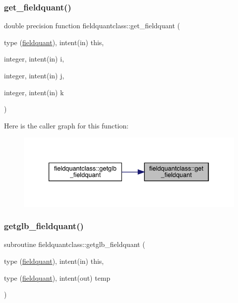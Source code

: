 \subsubsection{\texorpdfstring{get\_fieldquant()}{get\_fieldquant()}}
{\footnotesize\ttfamily double precision function fieldquantclass\+::get\+\_\+fieldquant (\begin{DoxyParamCaption}\item[{type (\mbox{\hyperlink{namespacefieldquantclass_structfieldquantclass_1_1fieldquant}{fieldquant}}), intent(in)}]{this,  }\item[{integer, intent(in)}]{i,  }\item[{integer, intent(in)}]{j,  }\item[{integer, intent(in)}]{k }\end{DoxyParamCaption})}

Here is the caller graph for this function\+:\nopagebreak
\begin{figure}[H]
\begin{center}
\leavevmode
\includegraphics[width=333pt]{namespacefieldquantclass_a5d4c07c22ffea0330d90b66e590b24a8_icgraph}
\end{center}
\end{figure}
\mbox{\label{namespacefieldquantclass_a2c0b0d0301e9ae5ccd8b2273ffc95ff3}} 
\subsubsection{\texorpdfstring{getglb\_fieldquant()}{getglb\_fieldquant()}}
{\footnotesize\ttfamily subroutine fieldquantclass\+::getglb\+\_\+fieldquant (\begin{DoxyParamCaption}\item[{type (\mbox{\hyperlink{namespacefieldquantclass_structfieldquantclass_1_1fieldquant}{fieldquant}}), intent(in)}]{this,  }\item[{type (\mbox{\hyperlink{namespacefieldquantclass_structfieldquantclass_1_1fieldquant}{fieldquant}}), intent(out)}]{temp }\end{DoxyParamCaption})}

